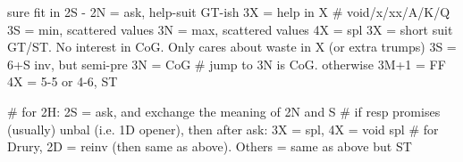 sure fit in 2S - 
2N = ask, help-suit GT-ish
   3X = help in X  # void/x/xx/A/K/Q
   3S = min, scattered values
   3N = max, scattered values
   4X = spl
3X = short suit GT/ST. No interest in CoG. Only cares about waste in X (or extra trumps)
3S = 6+S inv, but semi-pre
3N = CoG  # jump to 3N is CoG. otherwise 3M+1 = FF
4X = 5-5 or 4-6, ST

# for 2H: 2S = ask, and exchange the meaning of 2N and S
# if resp promises (usually) unbal (i.e. 1D opener), then after ask: 3X = spl, 4X = void spl
# for Drury, 2D = reinv (then same as above). Others = same as above but ST